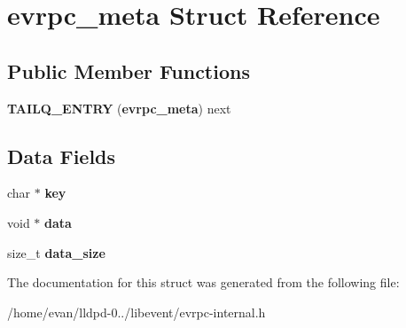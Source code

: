 \section{evrpc\-\_\-meta \-Struct \-Reference}
\label{structevrpc__meta}
\subsection*{\-Public \-Member \-Functions}
\begin{DoxyCompactItemize}
\item 
{\bfseries \-T\-A\-I\-L\-Q\-\_\-\-E\-N\-T\-R\-Y} ({\bf evrpc\-\_\-meta}) next\label{structevrpc__meta_a56cf085c1977068e941a33aa3e40896f}

\end{DoxyCompactItemize}
\subsection*{\-Data \-Fields}
\begin{DoxyCompactItemize}
\item 
char $\ast$ {\bfseries key}\label{structevrpc__meta_a5892a9181e6a332f84d27aecd41dcd12}

\item 
void $\ast$ {\bfseries data}\label{structevrpc__meta_a735984d41155bc1032e09bece8f8d66d}

\item 
size\-\_\-t {\bfseries data\-\_\-size}\label{structevrpc__meta_ad6bc120bffc64dfc5230863a8ba96596}

\end{DoxyCompactItemize}


\-The documentation for this struct was generated from the following file\-:\begin{DoxyCompactItemize}
\item 
/home/evan/lldpd-\/0../libevent/evrpc-\/internal.\-h\end{DoxyCompactItemize}
